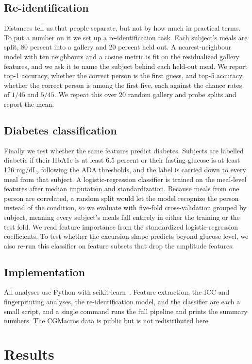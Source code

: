 \documentclass[10pt,conference,compsoc]{IEEEtran}
\begin{document}
\subsection{Re-identification}
Distances tell us that people separate, but not by how much in practical terms. To
put a number on it we set up a re-identification task. Each subject's meals are
split, 80 percent into a gallery and 20 percent held out. A nearest-neighbour
model with ten neighbours and a cosine metric is fit on the residualized gallery
features, and we ask it to name the subject behind each held-out meal. We report
top-1 accuracy, whether the correct person is the first guess, and top-5 accuracy,
whether the correct person is among the first five, each against the chance rates
of $1/45$ and $5/45$. We repeat this over 20 random gallery and probe splits and
report the mean.

\subsection{Diabetes classification}
Finally we test whether the same features predict diabetes. Subjects are labelled
diabetic if their HbA1c is at least 6.5 percent or their fasting glucose is at
least 126 mg/dL, following the ADA thresholds, and the label is carried down to
every meal from that subject. A logistic-regression classifier is trained on the
meal-level features after median imputation and standardization. Because meals
from one person are correlated, a random split would let the model recognize the
person instead of the condition, so we evaluate with five-fold cross-validation
grouped by subject, meaning every subject's meals fall entirely in either the
training or the test fold. We read feature importance from the standardized
logistic-regression coefficients. To test whether the excursion shape predicts
beyond glucose level, we also re-run this classifier on feature subsets that drop
the amplitude features.

\subsection{Implementation}
All analyses use Python with scikit-learn~\cite{pedregosa2011}. Feature
extraction, the ICC and fingerprinting analyses, the re-identification model, and
the classifier are each a small script, and a single command runs the full
pipeline and prints the summary numbers. The CGMacros data is public but is not
redistributed here.

\section{Results}
\end{document}
